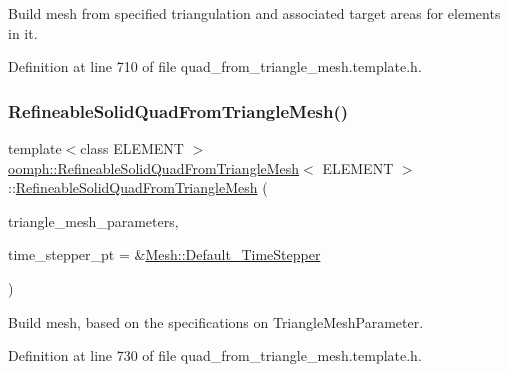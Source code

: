 Build mesh from specified triangulation and associated target areas for elements in it. 



Definition at line 710 of file quad\+\_\+from\+\_\+triangle\+\_\+mesh.\+template.\+h.

\mbox{\label{classoomph_1_1RefineableSolidQuadFromTriangleMesh_a2c73a5df8ad33217f0978417e9d6c690}} 
\subsubsection{\texorpdfstring{Refineable\+Solid\+Quad\+From\+Triangle\+Mesh()}{RefineableSolidQuadFromTriangleMesh()}\hspace{0.1cm}{\footnotesize\ttfamily [2/2]}}
{\footnotesize\ttfamily template$<$class E\+L\+E\+M\+E\+NT $>$ \\
\hyperlink{classoomph_1_1RefineableSolidQuadFromTriangleMesh}{oomph\+::\+Refineable\+Solid\+Quad\+From\+Triangle\+Mesh}$<$ E\+L\+E\+M\+E\+NT $>$\+::\hyperlink{classoomph_1_1RefineableSolidQuadFromTriangleMesh}{Refineable\+Solid\+Quad\+From\+Triangle\+Mesh} (\begin{DoxyParamCaption}\item[{\hyperlink{classoomph_1_1TriangleMeshParameters}{Triangle\+Mesh\+Parameters} \&}]{triangle\+\_\+mesh\+\_\+parameters,  }\item[{\hyperlink{classoomph_1_1TimeStepper}{Time\+Stepper} $\ast$}]{time\+\_\+stepper\+\_\+pt = {\ttfamily \&\hyperlink{classoomph_1_1Mesh_a12243d0fee2b1fcee729ee5a4777ea10}{Mesh\+::\+Default\+\_\+\+Time\+Stepper}} }\end{DoxyParamCaption})\hspace{0.3cm}{\ttfamily [inline]}}



Build mesh, based on the specifications on Triangle\+Mesh\+Parameter. 



Definition at line 730 of file quad\+\_\+from\+\_\+triangle\+\_\+mesh.\+template.\+h.

